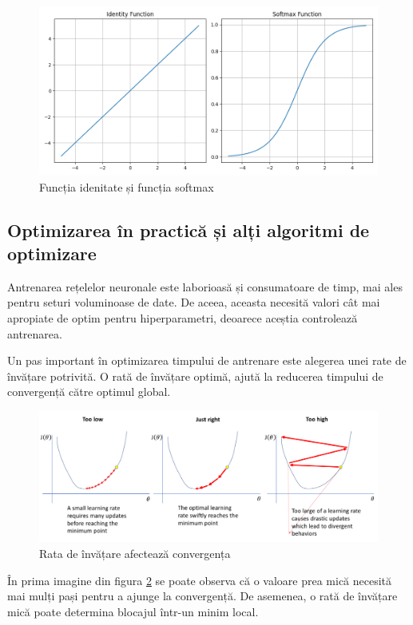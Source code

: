 \begin{figure}[h]
         \centering 
         \includegraphics[width=.65\linewidth]{images/activation_functions_output.png}
         \captionsetup{font=footnotesize}
         \caption{Funcția idenitate și funcția softmax}
         \label{}
\end{figure}


\subsection{Optimizarea în practică și alți algoritmi de optimizare}

Antrenarea rețelelor neuronale este laborioasă și consumatoare de timp, mai ales pentru seturi voluminoase de date. De aceea, aceasta necesită valori cât mai apropiate de optim pentru hiperparametri, deoarece aceștia controlează antrenarea. 

Un pas important în optimizarea timpului de antrenare este alegerea unei rate de învățare potrivită. O rată de învățare optimă, ajută la reducerea timpului de convergență către optimul global. 

\begin{figure}[h]
         \centering 
         \includegraphics[width=.85\linewidth]{images/learning_rate.png}
         \captionsetup{font=footnotesize}
         \caption{Rata de învățare afectează convergența\cite{learning-rate}}
         \label{Figura 2.9}
\end{figure}
În prima imagine din figura \ref{Figura 2.9} se poate observa că o valoare prea mică necesită mai mulți pași pentru a ajunge la convergență. De asemenea, o rată de învățare mică poate determina blocajul într-un minim local. 

